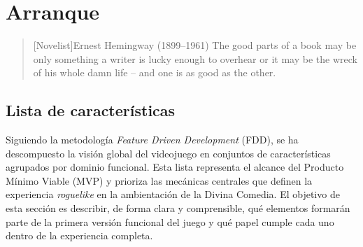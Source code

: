 \chapter{Arranque}

\begin{quotation}[Novelist]{Ernest Hemingway (1899--1961)}
The good parts of a book may be only something a writer is lucky enough to overhear or it may be the wreck of his whole damn life -- and one is as good as the other.
\end{quotation}

\begin{abstract}
En este capítulo se formaliza el alcance del proyecto y se 
establecen las bases técnicas para su desarrollo. El objetivo es 
traducir la visión conceptual de Via Inferni en una lista estructurada de 
requisitos funcionales, aplicando una primera iteración de la metodología Feature 
Driven Development (FDD). Asimismo, se define la arquitectura de software que soportará
dichas funcionalidades, detallando los entornos de producción, las herramientas de 
diseño de datos (preproducción) y la estrategia de pruebas necesaria para asegurar 
la calidad del software.
\end{abstract}

\section{Lista de características}

Siguiendo la metodología \textit{Feature Driven Development} (FDD), 
se ha descompuesto la visión global del videojuego en conjuntos de características 
agrupados por dominio funcional. Esta lista representa el alcance del 
Producto Mínimo Viable (MVP) y prioriza las mecánicas 
centrales que definen la experiencia \textit{roguelike} en la ambientación de 
la Divina Comedia. El objetivo de esta sección es describir, de forma clara y 
comprensible, qué elementos formarán parte de la primera versión funcional del juego 
y qué papel cumple cada uno dentro de la experiencia completa.

